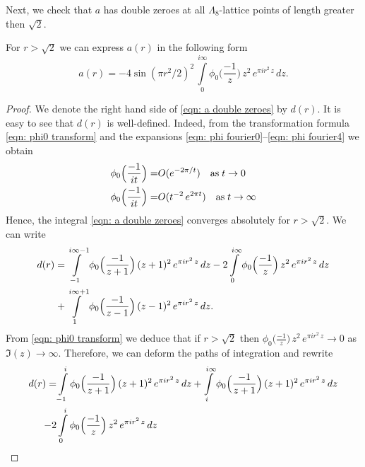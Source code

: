 Next, we check that $a$ has double zeroes at all $\Lambda_8$-lattice points of length greater then $\sqrt{2}$.

\begin{proposition}
\label{prop:a-double-zeros}
For $r>\sqrt{2}$ we can express $a(r)$ in the following form
\begin{equation}\label{eqn: a double zeroes}
    a(r)=-4\sin(\pi r^2/2)^2\,\int\limits_{0}^{i\infty}\phi_0\Big(\frac{-1}{z}\Big)\,z^2\,e^{\pi i r^2 \,z}\,dz.
\end{equation}
\end{proposition}
\begin{proof}
We denote the right hand side of \eqref{eqn: a double zeroes} by $d(r)$.    It is easy to see that $d(r)$ is well-defined. Indeed, from the transformation formula \eqref{eqn: phi0 transform} and the expansions \eqref{eqn: phi fourier0}--\eqref{eqn: phi fourier4} we obtain
\begin{align}
\phi_0\Big(\frac{-1}{it}\Big)=&O(e^{-2\pi/t})\quad\mbox{as}\;t\to 0\notag\\
\phi_0\Big(\frac{-1}{it}\Big)=&O(t^{-2}\,e^{2\pi t})\quad\mbox{as}\;t\to \infty\notag
\end{align}
Hence, the integral \eqref{eqn: a double zeroes} converges absolutely for $r>\sqrt{2}$.
    We can write %
\begin{align}
    d(r)=&\int\limits_{-1}^{i\infty-1}\phi_0\Big(\frac{-1}{z+1}\Big)\,(z+1)^2\,e^{\pi i r^2 \,z}\,dz-
    2\int\limits_{0}^{i\infty}\phi_0\Big(\frac{-1}{z}\Big)\,z^2\,e^{\pi i r^2 \,z}\,dz\notag\\
    +&\int\limits_{1}^{i\infty+1}\phi_0\Big(\frac{-1}{z-1}\Big)\,(z-1)^2\,e^{\pi i r^2 \,z}\,dz.\notag
\end{align}
From \eqref{eqn: phi0 transform} we deduce that if $r>\sqrt{2}$ then
$\phi_0\Big(\frac{-1}{z}\Big)\,z^2\,e^{\pi i r^2 \,z}\to 0$ as $\Im(z)\to\infty$. Therefore, we can deform the paths of integration
and rewrite
\begin{align}
    d(r)=&\int\limits_{-1}^{i}\phi_0\Big(\frac{-1}{z+1}\Big)\,(z+1)^2\,e^{\pi i r^2 \,z}\,dz
    +\int\limits_{i}^{i\infty}\phi_0\Big(\frac{-1}{z+1}\Big)\,(z+1)^2\,e^{\pi i r^2 \,z}\,dz\notag\\
    -2&\int\limits_{0}^{i}\phi_0\Big(\frac{-1}{z}\Big)\,z^2\,e^{\pi i r^2 \,z}\,dz

\end{align}
\end{proof}
